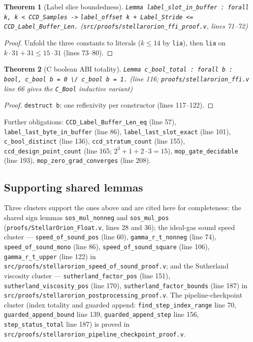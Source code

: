 \documentclass[11pt]{article}
\newtheorem{theorem}{Theorem}
\theoremstyle{definition}
\begin{document}
\begin{theorem}[Label slice boundedness]\label{thm:ffi-label}
\texttt{Lemma label\_slot\_in\_buffer : forall k, k < CCD\_Samples ->}
\texttt{label\_offset k + Label\_Stride <= CCD\_Label\_Buffer\_Len.}
(\texttt{src/proofs/stellarorion\_ffi\_proof.v}, lines 71--72)
\end{theorem}
\begin{proof}
Unfold the three constants to literals ($k \le 14$ by \texttt{lia}), then
\texttt{lia} on $k\cdot 31 + 31 \le 15 \cdot 31$ (lines 73--80).
\end{proof}

\begin{theorem}[C boolean ABI totality]\label{thm:ffi-bool}
\texttt{Lemma c\_bool\_total : forall b : bool, c\_bool b = 0 \textbackslash/ c\_bool b = 1.}
(line 116; \texttt{proofs/stellarorion\_ffi.v} line 66 gives the
\texttt{C\_Bool} inductive variant)
\end{theorem}
\begin{proof}
\verb|destruct b|; one reflexivity per constructor (lines 117--122).
\end{proof}

Further obligations: \texttt{CCD\_Label\_Buffer\_Len\_eq} (line 57),
\texttt{label\_last\_byte\_in\_buffer} (line 86),
\texttt{label\_last\_slot\_exact} (line 101), \texttt{c\_bool\_distinct}
(line 136), \texttt{ccd\_stratum\_count} (line 155),
\texttt{ccd\_design\_point\_count} (line 165; $2^3 + 1 + 2\cdot3 = 15$),
\texttt{mop\_gate\_decidable} (line 193),
\texttt{mop\_zero\_grad\_converges} (line 208).

\subsection{Supporting shared lemmas}\label{sec:misc}

Three clusters support the ones above and are cited here for completeness:
the shared sign lemmas \texttt{sos\_mul\_nonneg} and \texttt{sos\_mul\_pos}
(\texttt{proofs/StellarOrion\_Float.v}, lines 28 and 36); the ideal-gas
sound speed cluster --- \texttt{speed\_of\_sound\_pos} (line 60),
\texttt{gamma\_r\_t\_nonneg} (line 74), \texttt{speed\_of\_sound\_mono}
(line 86), \texttt{speed\_of\_sound\_square} (line 106),
\texttt{gamma\_r\_t\_upper} (line 122) in
\texttt{src/proofs/stellarorion\_speed\_of\_sound\_proof.v}; and the
Sutherland viscosity cluster --- \texttt{sutherland\_factor\_pos}
(line 151), \texttt{sutherland\_viscosity\_pos} (line 170),
\texttt{sutherland\_factor\_bounds} (line 187) in
\texttt{src/proofs/stellarorion\_postprocessing\_proof.v}. The
pipeline-checkpoint cluster (index totality and guarded append:
\texttt{find\_step\_index\_range} line 70, \texttt{guarded\_append\_bound}
line 139, \texttt{guarded\_append\_step} line 156,
\texttt{step\_status\_total} line 187) is proved in
\texttt{src/proofs/stellarorion\_pipeline\_checkpoint\_proof.v}.
\end{document}
